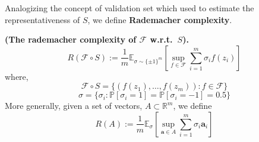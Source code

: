 Analogizing the concept of validation set which used to estimate the representativeness of $ S $, we define \textbf{Rademacher complexity}.
\begin{definition}
    \textbf{(The rademacher complexity of $ \mathcal{F} $ w.r.t.\ $ S $).}
    \begin{equation}
        R( \mathcal{F} \circ S ) := \frac{1}{m} \mathbb{E}_{\sigma \sim {\{ \pm 1 \}}^m}
        \left[ \sup_{f \in \mathcal{F}} \sum^{m}_{i=1} \sigma_i f(z_i)  \right]
    \end{equation}
    where,
    \[
        \mathcal{F}\circ S = \{(f(z_1), \ldots, f(z_m)) : f \in \mathcal{F}\}
    \]
    \[
        \sigma = \{ \sigma_i : \mathbb{P}[\sigma_i = 1] = \mathbb{P}[\sigma_i = -1] = 0.5 \}
    \]
    More generally, given a set of vectors, $ A \subset \mathbb{R}^m$, we define
    \[
        R(A) := \frac{1}{m} \mathbb{E}_\sigma \left[ \sup_{\mathbf{a} \in A} \sum^{m}_{i=1} \sigma_i \mathbf{a}_i \right]
    \]
\end{definition}

